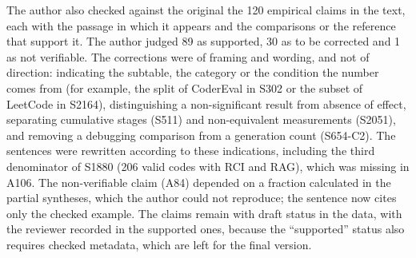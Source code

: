 The author also checked against the original the 120 empirical claims in the text, each with the passage in which it appears and the
comparisons or the reference that support it. The author judged 89 as supported, 30 as to be corrected and 1 as not
verifiable. The corrections were of framing and wording, and not of direction: indicating the subtable, the category or the
condition the number comes from (for example, the split of CoderEval in S302 or the subset of LeetCode in S2164),
distinguishing a non-significant result from absence of effect, separating cumulative stages (S511) and non-equivalent
measurements (S2051), and removing a debugging comparison from a generation count (S654-C2). The sentences were rewritten according to these indications,
including the third denominator of S1880 (206 valid codes with RCI and RAG), which was missing in A106. The non-verifiable claim (A84) depended on a fraction calculated in the
partial syntheses, which the author could not reproduce; the sentence now cites only the checked example.
The claims remain with draft status in the data, with the reviewer recorded in the supported ones, because the
``supported'' status also requires checked metadata, which are left for the final version.
